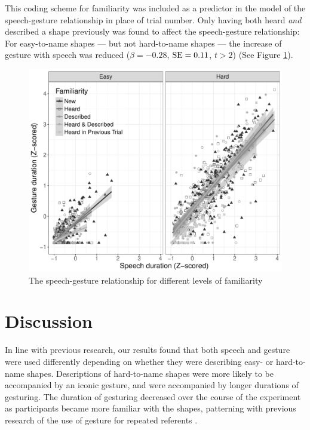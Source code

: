 \documentclass[a4paper,man,natbib]{apa6}
\newcommand{\resultsLM}[3]{$\beta = #1$, $\textnormal{SE} = #2$, $t #3$}
\begin{document}
This coding scheme for familiarity was included as a predictor in the model of the speech-gesture relationship in place of trial number. 
Only having both heard \textit{and} described a shape previously was found to affect the speech-gesture relationship: For easy-to-name shapes --- but not hard-to-name shapes --- the increase of gesture with speech was reduced (\resultsLM{-0.28}{0.11}{>2}) (See Figure \ref{fig:prev}).

\begin{figure}
  \centering
	\includegraphics[width=\linewidth]{img/prev_plot.pdf}
  \caption{The speech-gesture relationship for different levels of familiarity}
  \label{fig:prev}
\end{figure}


\section{Discussion}
In line with previous research, our results found that both speech and gesture were used differently depending on whether they were describing easy- or hard-to-name shapes. 
Descriptions of hard-to-name shapes were more likely to be accompanied by an iconic gesture, and were accompanied by longer durations of gesturing. 
The duration of gesturing decreased over the course of the experiment as participants became more familiar with the shapes, patterning with previous research of the use of gesture for repeated referents \citep{Hoetjes2015}.
\end{document}
